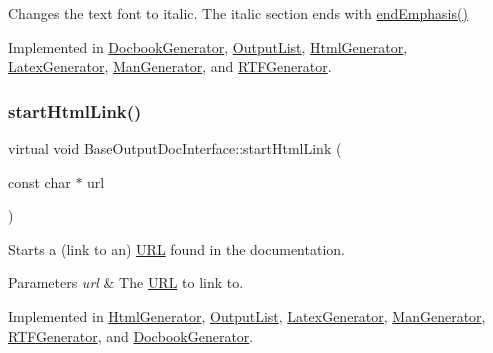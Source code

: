 Changes the text font to italic. The italic section ends with \mbox{\hyperlink{class_base_output_doc_interface_aed2cf04d82648509f97403bd4ce62590}{end\+Emphasis()}} 

Implemented in \mbox{\hyperlink{class_docbook_generator_ad3234d4df4f2e6db5e3e7d1c4c5b8382}{Docbook\+Generator}}, \mbox{\hyperlink{class_output_list_aba5576798309803175cefaedf33b2a28}{Output\+List}}, \mbox{\hyperlink{class_html_generator_afa50b0bc75a1f73eb0e86d4718534d1b}{Html\+Generator}}, \mbox{\hyperlink{class_latex_generator_a247441f3922c912966d8193f578f5c74}{Latex\+Generator}}, \mbox{\hyperlink{class_man_generator_a8a88956b0c96590290287835934344b9}{Man\+Generator}}, and \mbox{\hyperlink{class_r_t_f_generator_a235071d9e43bed7dabaec79e88bf43c7}{R\+T\+F\+Generator}}.

\mbox{\label{class_base_output_doc_interface_ab52dbf41ce337c701f9cd1e7794f80e7}} 
\subsubsection{\texorpdfstring{startHtmlLink()}{startHtmlLink()}}
{\footnotesize\ttfamily virtual void Base\+Output\+Doc\+Interface\+::start\+Html\+Link (\begin{DoxyParamCaption}\item[{const char $\ast$}]{url }\end{DoxyParamCaption})\hspace{0.3cm}{\ttfamily [pure virtual]}}

Starts a (link to an) \mbox{\hyperlink{struct_u_r_l}{U\+RL}} found in the documentation. 
\begin{DoxyParams}{Parameters}
{\em url} & The \mbox{\hyperlink{struct_u_r_l}{U\+RL}} to link to. \\
\hline
\end{DoxyParams}


Implemented in \mbox{\hyperlink{class_html_generator_a5fdd7ff7fcabd4e301b8fec2b9c72b85}{Html\+Generator}}, \mbox{\hyperlink{class_output_list_acfe3869e533af42c1446e2fc91a37e5e}{Output\+List}}, \mbox{\hyperlink{class_latex_generator_a491cb262e91a3f16b37d5dd2017e2f6a}{Latex\+Generator}}, \mbox{\hyperlink{class_man_generator_a605e678d3be65519e6b94dff6e403e79}{Man\+Generator}}, \mbox{\hyperlink{class_r_t_f_generator_a265ab601396745bb97d5c6cee59329d6}{R\+T\+F\+Generator}}, and \mbox{\hyperlink{class_docbook_generator_adf4463cfec2c9d8ca083367f2e4afeff}{Docbook\+Generator}}.

